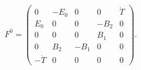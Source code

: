 \begin{equation}
F^0 = \left(\begin{array}{ccccc}
 0 & -E_0 & 0 & 0 & \dot T \\
 E_0 & 0 & 0 & -B_2 & 0 \\
 0 & 0 & 0 & B_1 & 0 \\
 0 & B_2 & -B_1 & 0 & 0 \\
-\dot T & 0 & 0 & 0 & 0
\end{array}\right).
\end{equation}

